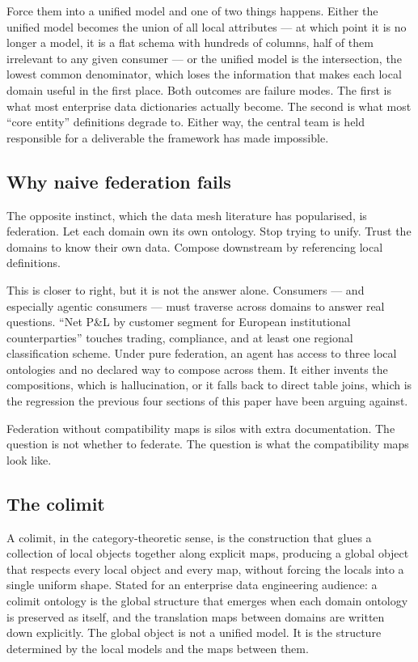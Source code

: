 \documentclass[11pt,a4paper]{article}
\begin{document}
Force them into a unified model and one of two things happens. Either the unified model becomes the union of all local attributes --- at which point it is no longer a model, it is a flat schema with hundreds of columns, half of them irrelevant to any given consumer --- or the unified model is the intersection, the lowest common denominator, which loses the information that makes each local domain useful in the first place. Both outcomes are failure modes. The first is what most enterprise data dictionaries actually become. The second is what most ``core entity'' definitions degrade to. Either way, the central team is held responsible for a deliverable the framework has made impossible.

\subsection{Why naive federation fails}

The opposite instinct, which the data mesh literature has popularised, is federation. Let each domain own its own ontology. Stop trying to unify. Trust the domains to know their own data. Compose downstream by referencing local definitions.

This is closer to right, but it is not the answer alone. Consumers --- and especially agentic consumers --- must traverse across domains to answer real questions. ``Net P\&L by customer segment for European institutional counterparties'' touches trading, compliance, and at least one regional classification scheme. Under pure federation, an agent has access to three local ontologies and no declared way to compose across them. It either invents the compositions, which is hallucination, or it falls back to direct table joins, which is the regression the previous four sections of this paper have been arguing against.

Federation without compatibility maps is silos with extra documentation. The question is not whether to federate. The question is what the compatibility maps look like.

\subsection{The colimit}

A colimit, in the category-theoretic sense, is the construction that glues a collection of local objects together along explicit maps, producing a global object that respects every local object and every map, without forcing the locals into a single uniform shape. Stated for an enterprise data engineering audience: a colimit ontology is the global structure that emerges when each domain ontology is preserved as itself, and the translation maps between domains are written down explicitly. The global object is not a unified model. It is the structure determined by the local models and the maps between them.
\end{document}
